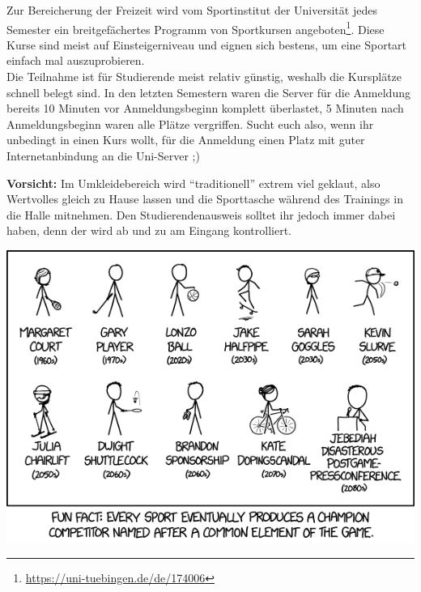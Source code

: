 Zur Bereicherung der Freizeit wird vom Sportinstitut der Universität jedes
Semester ein breitgefächertes Programm von Sportkursen
angeboten\footnote{\url{https://uni-tuebingen.de/de/174006}}. Diese Kurse sind
meist auf Einsteigerniveau und eignen sich bestens, um eine Sportart einfach
mal auszuprobieren.\\
Die Teilnahme ist für Studierende meist relativ günstig, weshalb die Kursplätze
schnell belegt sind. 
In den letzten Semestern waren die Server für die
Anmeldung bereits 10 Minuten vor Anmeldungsbeginn komplett überlastet, 5
Minuten nach Anmeldungsbeginn waren alle Plätze vergriffen. Sucht euch also,
wenn ihr unbedingt in einen Kurs wollt, für die Anmeldung einen Platz mit guter
Internetanbindung an die Uni-Server ;)

\textbf{Vorsicht:} Im Umkleidebereich wird "`traditionell"' extrem viel
  geklaut, also Wertvolles gleich
  zu Hause lassen und die Sporttasche wäh\-rend des Trainings in
  die Halle mitnehmen. Den Studierendenausweis solltet ihr jedoch immer dabei haben, 
  denn der wird ab und zu am Eingang kontrolliert.
 

\begin{center}
\includegraphics[width=0.6\hsize]{shared/xkcd/sports_champions.png}
\end{center}
